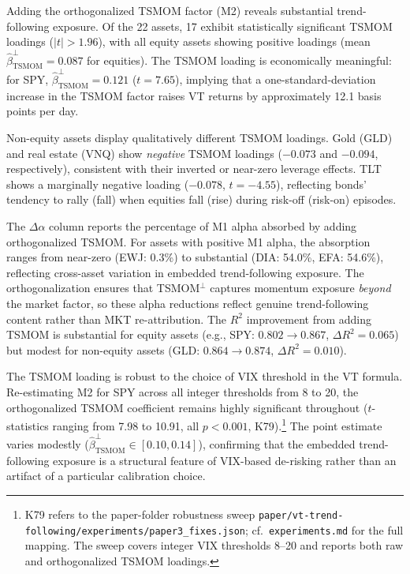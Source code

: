 Adding the orthogonalized TSMOM factor (M2) reveals substantial trend-following exposure. Of the 22 assets, 17 exhibit statistically significant TSMOM loadings ($|t| > 1.96$), with all equity assets showing positive loadings (mean $\hat{\beta}_{\text{TSMOM}}^{\perp} = 0.087$ for equities). The TSMOM loading is economically meaningful: for SPY, $\hat{\beta}_{\text{TSMOM}}^{\perp} = 0.121$ ($t = 7.65$), implying that a one-standard-deviation increase in the TSMOM factor raises VT returns by approximately 12.1 basis points per day.

Non-equity assets display qualitatively different TSMOM loadings. Gold (GLD) and real estate (VNQ) show \textit{negative} TSMOM loadings ($-0.073$ and $-0.094$, respectively), consistent with their inverted or near-zero leverage effects. TLT shows a marginally negative loading ($-0.078$, $t = -4.55$), reflecting bonds' tendency to rally (fall) when equities fall (rise) during risk-off (risk-on) episodes.

The $\Delta\alpha$ column reports the percentage of M1 alpha absorbed by adding orthogonalized TSMOM. For assets with positive M1 alpha, the absorption ranges from near-zero (EWJ: 0.3\%) to substantial (DIA: 54.0\%, EFA: 54.6\%), reflecting cross-asset variation in embedded trend-following exposure. The orthogonalization ensures that TSMOM$^{\perp}$ captures momentum exposure \textit{beyond} the market factor, so these alpha reductions reflect genuine trend-following content rather than MKT re-attribution. The $R^2$ improvement from adding TSMOM is substantial for equity assets (e.g., SPY: $0.802 \to 0.867$, $\Delta R^2 = 0.065$) but modest for non-equity assets (GLD: $0.864 \to 0.874$, $\Delta R^2 = 0.010$).

The TSMOM loading is robust to the choice of VIX threshold in the VT formula. Re-estimating M2 for SPY across all integer thresholds from 8 to 20, the orthogonalized TSMOM coefficient remains highly significant throughout ($t$-statistics ranging from 7.98 to 10.91, all $p < 0.001$, K79).\footnote{K79 refers to the paper-folder robustness sweep \texttt{paper/vt-trend-following/experiments/paper3\_fixes.json}; cf.~\texttt{experiments.md} for the full mapping. The sweep covers integer VIX thresholds 8--20 and reports both raw and orthogonalized TSMOM loadings.} The point estimate varies modestly ($\hat{\beta}_{\text{TSMOM}}^{\perp} \in [0.10, 0.14]$), confirming that the embedded trend-following exposure is a structural feature of VIX-based de-risking rather than an artifact of a particular calibration choice.



